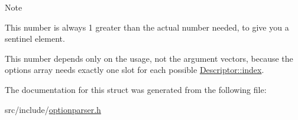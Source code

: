 \begin{DoxyNote}{Note}
\begin{DoxyItemize}
\item This number is always 1 greater than the actual number needed, to give you a sentinel element. \item This number depends only on the {\ttfamily usage}, not the argument vectors, because the {\ttfamily options} array needs exactly one slot for each possible \hyperlink{structxmem_1_1config_1_1third__party_1_1_descriptor_aacf3d44f35c61f22be65da078f60734b}{Descriptor\-::index}. \end{DoxyItemize}

\end{DoxyNote}


The documentation for this struct was generated from the following file\-:\begin{DoxyCompactItemize}
\item 
src/include/\hyperlink{optionparser_8h}{optionparser.\-h}\end{DoxyCompactItemize}
